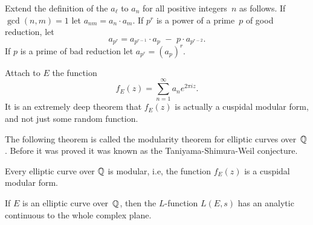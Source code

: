 Extend the definition of the $a_\ell$ to $a_n$ for all positive
integers~$n$ as follows.  If $\gcd(n,m)=1$ let $a_{nm} = a_n \cdot
a_m$.  If $p^r$ is a power of a prime~$p$ of good reduction, let
$$
 a_{p^r} = a_{p^{r-1}}\cdot a_p \,\,-\,\, p \cdot a_{p^{r-2}}.
$$
If $p$ is a prime of bad reduction let $a_{p^r} = (a_p)^r$.

Attach to $E$ the function
$$
  f_E(z) = \sum_{n=1}^{\infty} a_n e^{2\pi i z}.
$$
It is an extremely deep theorem that $f_E(z)$ is actually
a cuspidal modular form, and not just some random function.


The following theorem is called the modularity theorem for elliptic
curves over~$\mathbb{Q}$.  Before it was proved it was known as the
Taniyama-Shimura-Weil conjecture.
\begin{theorem}
Every elliptic curve over $\mathbb{Q}$ is modular, i.e, the function
$f_E(z)$  is a cuspidal modular form.
\end{theorem}

\begin{corollary}[Hecke]\label{cor:hecke}
  If $E$ is an elliptic curve over~$\mathbb{Q}$, then the $L$-function
  $L(E,s)$ has an analytic continuous to the whole complex plane.
\end{corollary}



